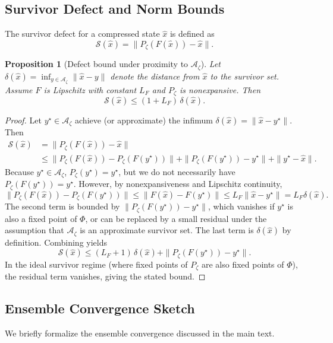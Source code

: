 \documentclass[11pt]{article}
\theoremstyle{definition}
\theoremstyle{plain}
\newtheorem{proposition}[definition]{Proposition}
\theoremstyle{remark}
\newcommand{\Azet}{\mathcal{A}_\zeta}
\begin{document}
\subsection{Survivor Defect and Norm Bounds}

The survivor defect for a compressed state $\hat{x}$ is defined as
\[
\mathcal{S}(\hat{x}) = \|P_\zeta(F(\hat{x})) - \hat{x}\|.
\]

\begin{proposition}[Defect bound under proximity to $\Azet$]
\label{prop:appendix-defect-bound}
Let $\delta(\hat{x}) = \inf_{y\in\Azet} \|\hat{x}-y\|$ denote the distance from $\hat{x}$ to the survivor set. Assume $F$ is Lipschitz with constant $L_F$ and $P_\zeta$ is nonexpansive. Then
\[
\mathcal{S}(\hat{x}) \le (1+L_F)\,\delta(\hat{x}).
\]
\end{proposition}

\begin{proof}
Let $y^\star\in\Azet$ achieve (or approximate) the infimum $\delta(\hat{x})=\|\hat{x}-y^\star\|$. Then
\begin{align*}
\mathcal{S}(\hat{x}) &= \|P_\zeta(F(\hat{x})) - \hat{x}\| \\
&\le \|P_\zeta(F(\hat{x})) - P_\zeta(F(y^\star))\| 
   + \|P_\zeta(F(y^\star)) - y^\star\|
   + \|y^\star - \hat{x}\|.
\end{align*}
Because $y^\star\in\Azet$, $P_\zeta(y^\star)=y^\star$, but we do not necessarily have $P_\zeta(F(y^\star))=y^\star$. However, by nonexpansiveness and Lipschitz continuity,
\[
\|P_\zeta(F(\hat{x})) - P_\zeta(F(y^\star))\| \le \|F(\hat{x})-F(y^\star)\| \le L_F \|\hat{x}-y^\star\| = L_F \delta(\hat{x}).
\]
The second term is bounded by $\|P_\zeta(F(y^\star)) - y^\star\|$, which vanishes if $y^\star$ is also a fixed point of $\Phi$, or can be replaced by a small residual under the assumption that $\Azet$ is an approximate survivor set. The last term is $\delta(\hat{x})$ by definition. Combining yields
\[
\mathcal{S}(\hat{x}) \le (L_F+1)\,\delta(\hat{x}) + \|P_\zeta(F(y^\star)) - y^\star\|.
\]
In the ideal survivor regime (where fixed points of $P_\zeta$ are also fixed points of $\Phi$), the residual term vanishes, giving the stated bound.
\end{proof}

\subsection{Ensemble Convergence Sketch}

We briefly formalize the ensemble convergence discussed in the main text.
\end{document}
